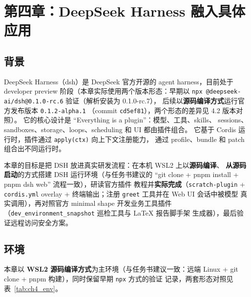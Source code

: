 \clearpage
\section{第四章：DeepSeek Harness 融入具体应用}

\subsection{背景}

DeepSeek Harness（dsh）是 DeepSeek 官方开源的 agent harness，目前处于
developer preview 阶段（本章实际使用两个版本形态：早期以
\texttt{npx @deepseek-ai/dsh@0.1.0-rc.6} 验证（解析安装为 0.1.0-rc.7），
后续以\textbf{源码编译方式}运行官方发布版本 \texttt{0.1.2-alpha.1}
（commit \texttt{cd5ef81}），两个形态的差异见 4.2 版本对照）。
它的核心设计是 ``Everything is a plugin''：模型、工具、skills、
sessions、sandboxes、storage、loops、scheduling 和 UI 都由插件组合。
它基于 Cordis 运行时，插件通过 \texttt{apply(ctx)} 向上下文注册能力，
通过 profile、bundle 和 patch 组合出不同运行时。

本章的目标是把 DSH 放进真实研发流程：在本机 WSL2 上以\textbf{源码编译}、
\textbf{从源码启动}的方式搭建 DSH 运行环境（与任务书建议的
``git clone + pnpm install + pnpm dsh web'' 流程一致），研读官方插件
教程并\textbf{实际完成}（\texttt{scratch-plugin} + \texttt{cordis.yml}
overlay + 终端输出；注册 \texttt{greet} 工具并在 Web UI 会话中被模型
真实调用），再对照官方 minimal shape 开发业务工具插件
（\texttt{dev\_environment\_snapshot} 巡检工具与 LaTeX 报告脚手架
生成器），最后验证远程访问安全方案。

\subsection{环境}

本章以 \textbf{WSL2 源码编译方式}为主环境（与任务书建议一致：远端
Linux + git clone + pnpm 构建），同时保留早期 \texttt{npx} 方式的验证
记录，两套形态对照见表~\ref{tab:ch4_env}。

